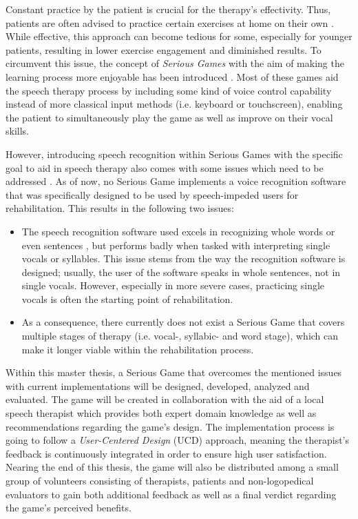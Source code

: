 \documentclass[draft,final]{vutinfth} %
\begin{document}
Constant practice by the patient is crucial for the therapy's effectivity. Thus, patients are often advised to practice certain exercises at home on their own \cite{musicco2003early}. While effective, this approach can become tedious for some, especially for younger patients, resulting in lower exercise engagement and diminished results. To circumvent this issue, the concept of \emph{Serious Games} with the aim of making the learning process more enjoyable has been introduced \cite{lv2015game}. Most of these games aid the speech therapy process by including some kind of voice control capability instead of more classical input methods (i.e. keyboard or touchscreen), enabling the patient to simultaneously play the game as well as improve on their vocal skills.

However, introducing speech recognition within Serious Games with the specific goal to aid in speech therapy also comes with some issues which need to be addressed \cite{rohlfing2021hey}. As of now, no Serious Game implements a voice recognition software that was specifically designed to be used by speech-impeded users for rehabilitation. This results in the following two issues:
\begin{itemize}
\item The speech recognition software used excels in recognizing whole words or even sentences \cite{rohlfing2021hey}, but performs badly when tasked with interpreting single vocals or syllables. This issue stems from the way the recognition software is designed; usually, the user of the software speaks in whole sentences, not in single vocals. However, especially in more severe cases, practicing single vocals is often the starting point of rehabilitation.
\item As a consequence, there currently does not exist a Serious Game that covers multiple stages of therapy (i.e. vocal-, syllabic- and word stage), which can make it longer viable within the rehabilitation process.
\end{itemize}

Within this master thesis, a Serious Game that overcomes the mentioned issues with current implementations will be designed, developed, analyzed and evaluated. The game will be created in collaboration with the aid of a local speech therapist which provides both expert domain knowledge as well as recommendations regarding the game's design. The implementation process is going to follow a \emph{User-Centered Design} (UCD) approach, meaning the therapist's feedback is continuously integrated in order to ensure high user satisfaction. Nearing the end of this thesis, the game will also be distributed among a small group of volunteers consisting of therapists, patients and non-logopedical evaluators to gain both additional feedback as well as a final verdict regarding the game's perceived benefits. 
\end{document}
